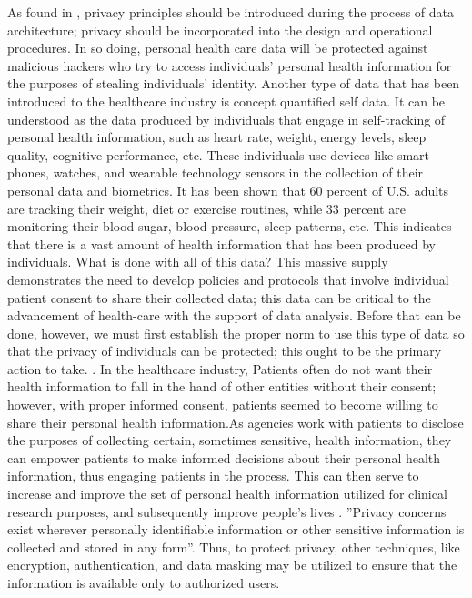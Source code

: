 \documentclass[sigconf]{acmart}
\begin{document}
As found in \cite{cavoukian2012privacy}, privacy principles should be introduced during the process of data architecture; privacy should be incorporated into the design and operational procedures. In so doing, personal health care data will be protected against malicious hackers who try to access individuals' personal health information for the purposes of stealing individuals' identity. Another type of data that has been introduced to the healthcare industry is concept quantified self data. It can be understood as the data produced by individuals that engage in self-tracking of personal health information, such as heart rate, weight, energy levels, sleep quality, cognitive performance, etc. These individuals use devices like smart-phones, watches, and wearable technology sensors in the collection of their personal data and biometrics. It has been shown that 60 percent of U.S. adults are tracking their weight, diet or exercise routines, while 33 percent are monitoring their blood sugar, blood pressure, sleep patterns, etc. This indicates that there is a vast amount of health information that has been produced by individuals. What is done with all of this data? This massive supply demonstrates the need to develop policies and protocols that involve individual patient consent to share their collected data; this data can be critical to the advancement of health-care with the support of data analysis. Before that can be done, however, we must first establish the proper norm to use this type of data so that the privacy of individuals can be protected; this ought to be the primary action to take. \cite{swan2013quantified}.
In the healthcare industry, Patients often do not want their health information to fall in the hand of other entities without their consent; however, with proper informed consent, patients seemed to become willing to share their personal health information.As agencies work with patients to disclose the purposes of collecting certain, sometimes sensitive, health information, they can empower patients to make informed decisions about their personal health information, thus engaging patients in the process. This can then serve to increase and improve the set of personal health information utilized for clinical research purposes, and subsequently improve people's lives \cite{shelton2011electronic}. 
 ''Privacy concerns exist wherever personally identifiable information or other sensitive information is collected and stored in any form''\cite{khan2016digital}. Thus, to protect privacy, other techniques, like encryption, authentication, and data masking may be utilized to ensure that the information is available only to authorized users.
 
\end{document}
